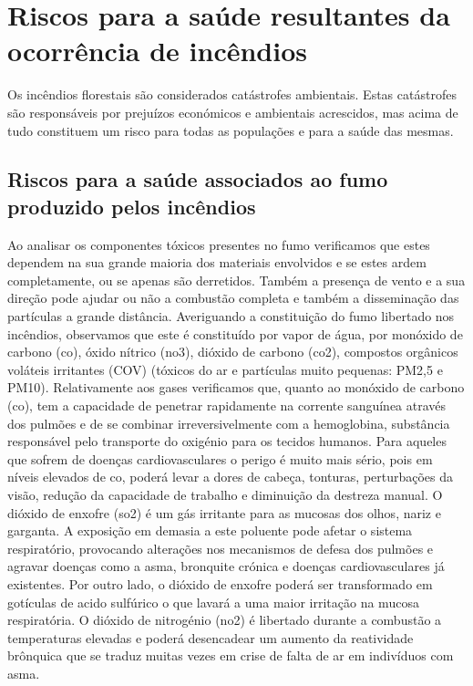 \documentclass{report}
\begin{document}
\chapter{Riscos para a saúde resultantes da ocorrência de incêndios}
\cite{dgsefeitos-fumo}

Os incêndios florestais são considerados catástrofes ambientais. Estas catástrofes são responsáveis por prejuízos económicos e ambientais acrescidos, mas acima de tudo constituem um risco para todas as populações e para a saúde das mesmas.



\section{Riscos para a saúde associados ao fumo produzido pelos incêndios}
\label{riscos para a saúde associados ao fumo produzido pelos incêndios}
\cite{dgsefeitos-fumo}

Ao analisar os componentes tóxicos presentes no fumo verificamos que estes dependem na sua grande maioria dos materiais envolvidos e se estes ardem completamente, ou se apenas são derretidos. Também a presença de vento e a sua direção pode ajudar ou não a combustão completa e também a disseminação das partículas a grande distância.
 Averiguando a constituição do fumo libertado nos incêndios, observamos que este é constituído por vapor de água, por monóxido de carbono (\ac{co}), óxido nítrico (\ac{no3}), dióxido de carbono (\ac{co2}), compostos orgânicos voláteis irritantes (COV) (tóxicos do ar e partículas muito pequenas: PM2,5 e PM10).
Relativamente aos gases verificamos que, quanto ao monóxido de carbono (\ac{co}), tem a capacidade de penetrar rapidamente na corrente sanguínea através dos pulmões e de se combinar irreversivelmente com a hemoglobina, substância responsável pelo transporte do oxigénio para os tecidos humanos. Para aqueles que sofrem de doenças cardiovasculares o perigo é muito mais sério, pois em níveis elevados de \ac{co}, poderá levar a dores de cabeça, tonturas, perturbações da visão, redução da capacidade de trabalho e diminuição da destreza manual.
O dióxido de enxofre (\ac{so2}) é um gás irritante para as mucosas dos olhos, nariz e garganta. A exposição em demasia a este poluente pode afetar o sistema respiratório, provocando alterações nos mecanismos de defesa dos pulmões e agravar doenças como a asma, bronquite crónica e doenças cardiovasculares já existentes. Por outro lado, o dióxido de enxofre poderá ser transformado em gotículas de acido sulfúrico o que lavará a uma maior irritação na mucosa respiratória.
O dióxido de nitrogénio (\ac{no2}) é libertado durante a combustão a temperaturas elevadas e poderá desencadear um aumento da reatividade brônquica que se traduz muitas vezes em crise de falta de ar em indivíduos com asma.
\end{document}
